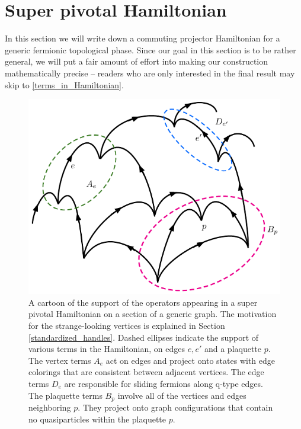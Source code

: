 


 \section{Super pivotal Hamiltonian}
 \label{Super_pivotal_Hamiltonian}

In this section we will write down a commuting projector Hamiltonian 
for a generic fermionic topological phase. 
Since our goal in this section is to be rather general, we will put a fair amount of effort into making our construction 
mathematically precise -- readers who are only interested in the final result may skip to \ref{terms_in_Hamiltonian}. 

 \begin{figure}
\begin{center}
  \includegraphics{sample_lattice.pdf}
 \caption{A cartoon of the support of the operators appearing in a super pivotal Hamiltonian on a section of a generic graph. 
The motivation for the strange-looking vertices is explained in Section \ref{standardized_handles}.
Dashed ellipses indicate the support of various terms in the Hamiltonian, on edges $e,e'$ and a plaquette $p$.
The vertex terms $A_e$ act on edges and project onto states with edge colorings that are consistent between adjacent vertices. 
The edge terms $D_e$ are responsible for sliding fermions along q-type edges. 
The plaquette terms $B_p$ involve all of the vertices and edges neighboring $p$.
They project onto graph configurations that contain no quasiparticles within the plaquette $p$.}
 \label{example_lattice}
 \end{center}
 \end{figure}


